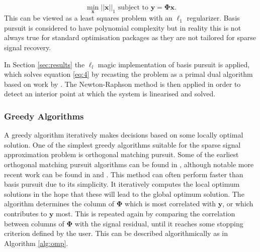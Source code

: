 \begin{equation}
  \label{eq:4}
  \min_{\boldsymbol{x}} ||\boldsymbol{x}||_1 \text{ subject to } \boldsymbol{y} = \boldsymbol{\Phi} \boldsymbol{x}.
\end{equation}
This can be viewed as a least squares problem with an $\ell_1$ regularizer. Basis pursuit is considered to have polynomial complexity but in reality this is not always true for standard optimisation packages as they are not tailored for sparse signal recovery. 


In Section \ref{sec:results} the $\ell_l$ magic \citep{Candes2005} implementation of basis pursuit is applied, which solves equation \eqref{eq:4} by recasting the problem as a primal dual algorithm based on work by \cite{boyd2004convex}. The Newton-Raphson method is then applied in order to detect an interior point at which the system is linearised and solved. 
\subsubsection{Greedy Algorithms}
\label{sec:greedy-algorithm}
A greedy algorithm iteratively makes decisions based on some locally optimal solution. One of the simplest greedy algorithms suitable for the sparse signal approximation problem is orthogonal matching pursuit. Some of the earliest orthogonal matching pursuit algorithms can be found in \cite{pati1993, davis1997}, although notable more recent work can be found in  \cite{Tropp2004} and \cite{Tropp2007}. This method can often perform faster than basis pursuit due to its simplicity. It iteratively computes the local optimum solutions in the hope that these will lead to the global optimum solution. The algorithm determines the column of $\boldsymbol{\Phi}$ which is most correlated with $\boldsymbol{y}$, or which contributes to $\boldsymbol{y}$ most. This is repeated again by comparing the correlation between columns of $\boldsymbol{\Phi}$ with the signal residual, until it reaches some stopping criterion defined by the user.  This can be described algorithmically as in Algorithm \ref{alg:omp}.  


